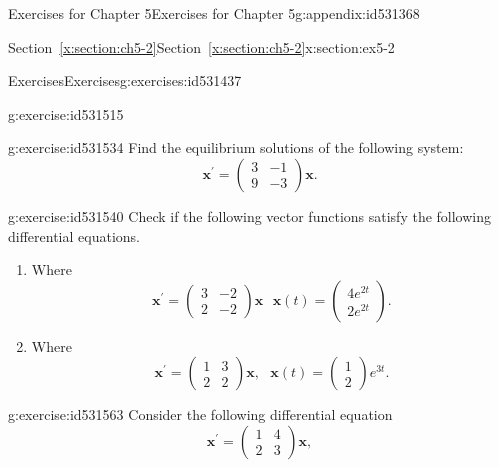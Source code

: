 \documentclass[oneside,10pt,]{book}
\newcommand{\xreffont}{\relax}
\numberwithin{equation}{section}
\numberwithin{equation}{section}
\newcommand{\amp}{&}
\begin{document}
\begin{appendixptx}{Exercises for Chapter 5}{}{Exercises for Chapter 5}{}{}{g:appendix:id531368}
\begin{sectionptx}{Section~{\xreffont\ref*{x:section:ch5-2}}}{}{Section~{\xreffont\ref*{x:section:ch5-2}}}{}{}{x:section:ex5-2}
\begin{exercises-subsection-numberless}{Exercises}{}{Exercises}{}{}{g:exercises:id531437}
\begin{divisionexercise}{4}{}{}{g:exercise:id531515}
\begin{equation*}
\end{equation*}
%
\end{divisionexercise}%
\begin{divisionexercise}{5}{}{}{g:exercise:id531534}%
Find the equilibrium solutions of the following system:%
\begin{equation*}
\mathbf{x}^{\prime}=\left(\begin{array}{cc}
3 \amp -1\\
9 \amp -3
\end{array}\right)\mathbf{x}.
\end{equation*}
%
\end{divisionexercise}%
\begin{divisionexercise}{6}{}{}{g:exercise:id531540}%
Check if the following vector functions satisfy the following differential equations.%
%
\begin{enumerate}[label=(\alph*)]
\item{}Where%
\begin{equation*}
\mathbf{x}^{\prime}=\left(\begin{array}{cc}
3 \amp -2\\
2 \amp -2
\end{array}\right)\mathbf{x}\,\,\,\,\mathbf{x}(t)=\left(\begin{array}{c}
4e^{2t}\\
2e^{2t}
\end{array}\right).
\end{equation*}
%
\item{}Where%
\begin{equation*}
\mathbf{x}^{\prime}=\left(\begin{array}{cc}
1 \amp 3\\
2 \amp 2
\end{array}\right)\mathbf{x},\,\,\,\,\mathbf{x}(t)=\left(\begin{array}{c}
1\\
2
\end{array}\right)e^{3t}.
\end{equation*}
%
\end{enumerate}
\end{divisionexercise}%
\begin{divisionexercise}{7}{}{}{g:exercise:id531563}%
Consider the following differential equation%
\begin{equation*}
\mathbf{x}^{\prime}=\left(\begin{array}{cc}
1 \amp 4\\
2 \amp 3
\end{array}\right)\mathbf{x},

\end{equation*}
\end{divisionexercise}
\end{exercises-subsection-numberless}
\end{sectionptx}
\end{appendixptx}
\end{document}
